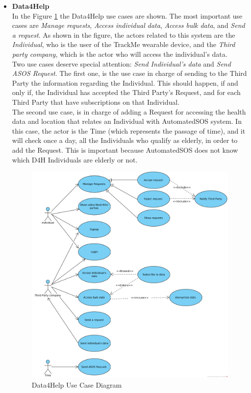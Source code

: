 \documentclass[a4paper, hidelinks, 12pt]{report}
\begin{document}
	\begin{itemize}
		\item{\textbf{Data4Help}} \\
		In the Figure \ref{fig:d4h_use_cases} the Data4Help use cases are shown. The most important use cases are \textit{Manage requests}, \textit{Access individual data}, \textit{Access bulk data}, and \textit{Send a request}. As shown in the figure, the actors related to this system are the \textit{Individual}, who is the user of the TrackMe wearable device, and the \textit{Third party company}, which is the actor who will access the individual's data.\\
		
		Two use cases deserve special attention: \textit{Send Individual's data} and \textit{Send ASOS Request}. The first one, is the use case in charge of sending to the Third Party the information regarding the Individual. This should happen, if and only if, the Individual has accepted the Third Party's Request, and for each Third Party that have subscriptions on that Individual. \\
		
		The second use case, is in charge of adding a Request for accessing the health data and location that relates an Individual with AutomatedSOS system. In this case, the actor is the Time (which represents the passage of time), and it will check once a day, all the Individuals who qualify as elderly, in order to add the Request. This is important because AutomatedSOS does not know which D4H Individuals are elderly or not.
		
		\begin{figure}[H]
			\centering
			\includegraphics[width=1\textwidth]{Diagrams/d4h_use_cases.png}
			\caption[Data4Help use case diagram]{Data4Help Use Case Diagram}
			\label{fig:d4h_use_cases}
		\end{figure}
		

\end{itemize}
\end{document}

